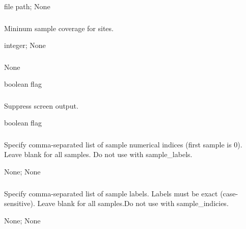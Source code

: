 \documentclass[letterpaper,11pt,english]{sphinxmanual}
\begin{document}
 file path;  None


\subsubsection{}
\label{\detokenize{prog_desc:id78}}
 Mininum sample coverage for sites.

 integer;  None


\subsubsection{}
\label{\detokenize{prog_desc:output-lists}}
 None

 boolean flag


\subsubsection{}
\label{\detokenize{prog_desc:id79}}
 Suppress screen output.

 boolean flag


\subsubsection{}
\label{\detokenize{prog_desc:id80}}
 Specify comma-separated list of sample numerical indices (first sample is 0). Leave blank for all samples. Do not use with \textendash{}sample\_labels.

 None;  None


\subsubsection{}
\label{\detokenize{prog_desc:id81}}
 Specify comma-separated list of sample labels. Labels must be exact (case-sensitive). Leave blank for all samples.Do not use with \textendash{}sample\_indicies.

 None;  None
\end{document}
